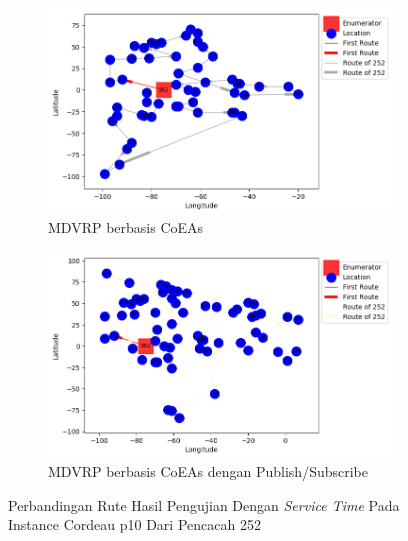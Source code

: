 \begin{figure}[H]
	\centering
	\begin{subfigure}[t]{\textwidth}
		\centering
		\includegraphics[width=\textwidth]{Resources/Images/cordeau_p10_tw/cordeau_p10_tw_252_coes}
		\caption{MDVRP berbasis CoEAs}
		\label{fig:cordeau_p10_tw_252_coes}
	\end{subfigure}
	\begin{subfigure}[t]{\textwidth}
		\centering
		\includegraphics[width=\textwidth]{Resources/Images/cordeau_p10_tw/cordeau_p10_tw_252_pubsub_coes}
		\caption{MDVRP berbasis CoEAs dengan Publish/Subscribe}
		\label{fig:cordeau_p10_tw_252_pubsub_coes}
	\end{subfigure}
	\caption{Perbandingan Rute Hasil Pengujian Dengan \textit{Service Time} Pada Instance Cordeau p10 Dari Pencacah 252}
	\label{fig:cordeau_p10_tw_252}
\end{figure}


